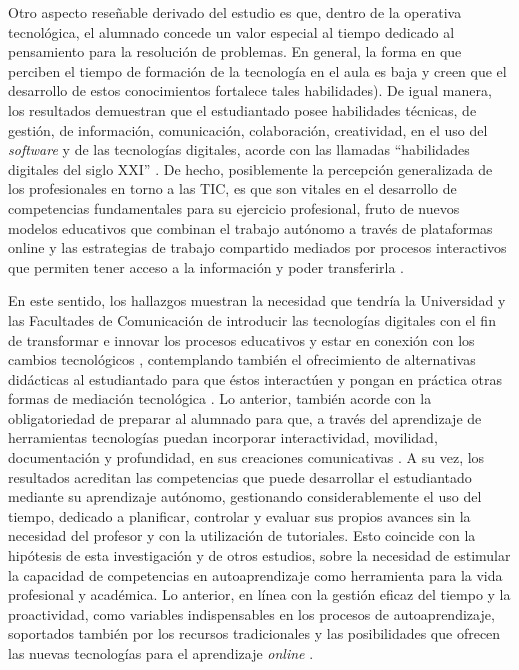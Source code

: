 \documentclass[spanish]{textolivre}
\begin{document}
Otro aspecto reseñable derivado del estudio es que, dentro de la operativa tecnológica, el alumnado concede un valor especial al tiempo dedicado al pensamiento para la resolución de problemas. En general, la forma en que perciben el tiempo de formación de la tecnología en el aula es baja y creen que el desarrollo de estos conocimientos fortalece tales habilidades). De igual manera, los resultados demuestran que el estudiantado posee habilidades técnicas, de gestión, de información, comunicación, colaboración, creatividad, en el uso del \textit{software} y de las tecnologías digitales, acorde con las llamadas “habilidades digitales del siglo XXI” \cite{van_laar_relation_2017}. De hecho, posiblemente la percepción generalizada de los profesionales en torno a las TIC, es que son vitales en el desarrollo de competencias fundamentales para su ejercicio profesional, fruto de nuevos modelos educativos que combinan el trabajo autónomo a través de plataformas online y las estrategias de trabajo compartido mediados por procesos interactivos que permiten tener acceso a la información y poder transferirla \cite{alcala_del_olmo_fernandez_competencias_2020}.

En este sentido, los hallazgos muestran la necesidad que tendría la Universidad y las Facultades de Comunicación de introducir las tecnologías digitales con el fin de transformar e innovar los procesos educativos \cite{urcid_puga_autoaprendizaje_2022} y estar en conexión con los cambios tecnológicos \cite{falco_reconsiderando_2017}, contemplando también el ofrecimiento de alternativas didácticas al estudiantado para que éstos interactúen y pongan en práctica otras formas de mediación tecnológica \cite{pastor-rodriguez_pildoras_2022}. Lo anterior, también acorde con la obligatoriedad de preparar al alumnado para que, a través del aprendizaje de herramientas tecnologías puedan incorporar interactividad, movilidad, documentación y profundidad, en sus creaciones comunicativas \cite{lopez-garcia_mobile_2019}. A su vez, los resultados acreditan las competencias que puede desarrollar el estudiantado mediante su aprendizaje autónomo, gestionando considerablemente el uso del tiempo, dedicado a planificar, controlar y evaluar sus propios avances sin la necesidad del profesor y con la utilización de tutoriales. Esto coincide con la hipótesis de esta investigación y de otros estudios, sobre la necesidad de estimular la capacidad de competencias en autoaprendizaje como herramienta para la vida profesional y académica. Lo anterior, en línea con la gestión eficaz del tiempo y la proactividad, como variables indispensables en los procesos de autoaprendizaje, soportados también por los recursos tradicionales y las posibilidades que ofrecen las nuevas tecnologías para el aprendizaje \textit{online} \cite{medina-labrador_effects_2023}.
\end{document}
